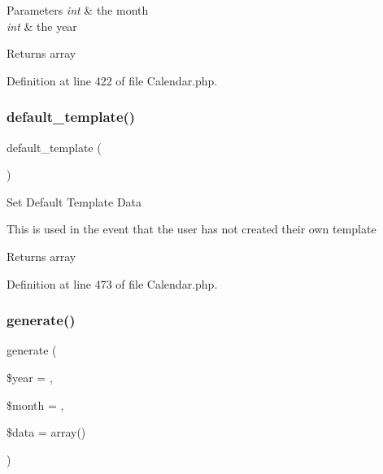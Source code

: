 \begin{DoxyParams}{Parameters}
{\em int} & the month \\
\hline
{\em int} & the year \\
\hline
\end{DoxyParams}
\begin{DoxyReturn}{Returns}
array 
\end{DoxyReturn}


Definition at line 422 of file Calendar.\+php.

\mbox{\label{class_c_i___calendar_a5d174710ed7a2a08df21dbaa2bb6a50f}} 
\subsubsection{\texorpdfstring{default\_template()}{default\_template()}}
{\footnotesize\ttfamily default\+\_\+template (\begin{DoxyParamCaption}{ }\end{DoxyParamCaption})}

Set Default Template Data

This is used in the event that the user has not created their own template

\begin{DoxyReturn}{Returns}
array 
\end{DoxyReturn}


Definition at line 473 of file Calendar.\+php.

\mbox{\label{class_c_i___calendar_aabfc9d516a481b11230cd6562f6809f2}} 
\subsubsection{\texorpdfstring{generate()}{generate()}}
{\footnotesize\ttfamily generate (\begin{DoxyParamCaption}\item[{}]{\$year = {\ttfamily \textquotesingle{}\textquotesingle{}},  }\item[{}]{\$month = {\ttfamily \textquotesingle{}\textquotesingle{}},  }\item[{}]{\$data = {\ttfamily array()} }\end{DoxyParamCaption})}

